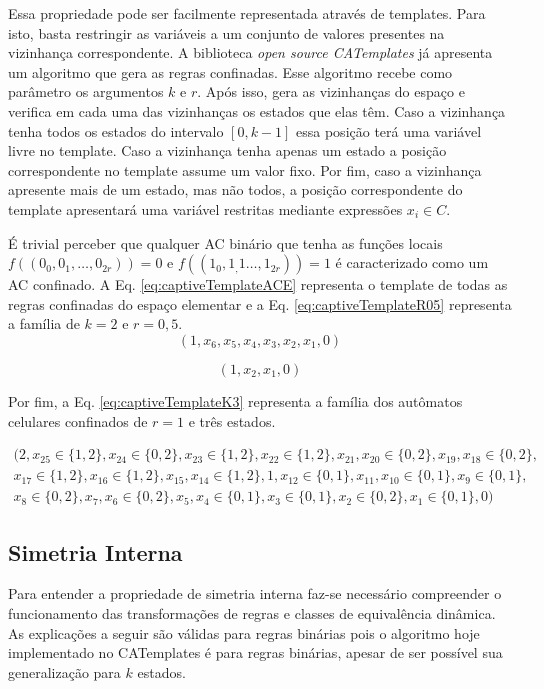 Essa propriedade pode ser facilmente representada através de templates. Para isto, basta restringir as variáveis a um conjunto de valores presentes na vizinhança correspondente. A biblioteca \textit{open source CATemplates} já apresenta um algoritmo que gera as regras confinadas. Esse algoritmo recebe como parâmetro os argumentos $k$ e $r$. Após isso, gera as vizinhanças do espaço e verifica em cada uma das vizinhanças os estados que elas têm. Caso a vizinhança tenha todos os estados do intervalo $[0, k-1]$ essa posição terá uma variável livre no template. Caso a vizinhança tenha apenas um estado a posição correspondente no template assume um valor fixo. Por fim, caso a vizinhança apresente mais de um estado, mas não todos, a posição correspondente do template apresentará uma variável restritas mediante expressões $x_i \in C$.

É trivial perceber que qualquer AC binário que tenha as funções locais $f((0_0, 0_1,\dots, 0_{2r})) = 0$ e $f((1_0, 1_,1\dots, 1_{2r})) = 1$ é caracterizado como um AC confinado. A Eq. \eqref{eq:captiveTemplateACE} representa o template de todas as regras confinadas do espaço elementar e a Eq. \eqref{eq:captiveTemplateR05} representa a família de $k=2$ e $r=0,5$.
\begin{equation}
(1,x_6,x_5,x_4,x_3,x_2,x_1,0)
\label{eq:captiveTemplateACE}
\end{equation}

\begin{equation}
(1,x_2,x_1,0)
\label{eq:captiveTemplateR05}
\end{equation}

Por fim, a Eq. \eqref{eq:captiveTemplateK3} representa a família dos autômatos celulares confinados de $r=1$ e três estados.

\begin{equation}
\begin{split}
(2, x_{25} \in \{1,2\}, x_{24} \in \{0,2\}, x_{23} \in \{1,2\}, x_{22} \in \{1,2\}, x_{21}, x_{20} \in \{0,2\}, x_{19}, x_{18} \in \{0,2\}, \\
x_{17} \in \{1,2\}, x_{16} \in \{1,2\}, x_{15}, x_{14} \in \{1,2\},1, x_{12} \in \{0,1\}, x_{11}, x_{10} \in \{0,1\}, x_9 \in \{0,1\}, \\
x_8 \in \{0,2\}, x_7, x_6 \in \{0,2\}, x_5, x_4 \in \{0,1\}, x_3 \in \{0,1\}, x_2 \in \{0,2\}, x_1 \in \{0,1\}, 0)
\label{eq:captiveTemplateK3}
\end{split}
\end{equation}

\subsection{Simetria Interna}
Para entender a propriedade de simetria interna faz-se necessário compreender o funcionamento das transformações de regras e classes de equivalência dinâmica. As explicações a seguir são válidas para regras binárias pois o algoritmo hoje implementado no CATemplates é para regras binárias, apesar de ser possível sua generalização para $k$ estados.

